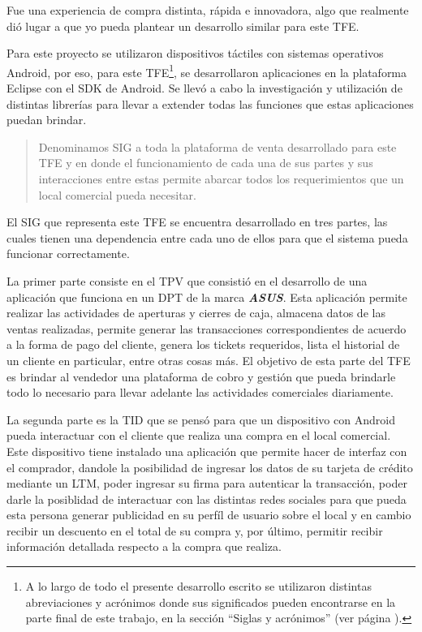 Fue una experiencia de compra distinta, r\'apida e innovadora, algo que realmente di\'o lugar a que yo pueda plantear un desarrollo similar para este \ac{TFE}.

Para este proyecto se utilizaron dispositivos t\'actiles con sistemas operativos Android\Si{\texttrademark}, por eso, para este \ac{TFE}\footnote{A lo largo de todo el presente desarrollo escrito se utilizaron distintas abreviaciones y acr\'onimos donde sus significados pueden encontrarse en la parte final de este trabajo, en la secci\'on ``Siglas y acr\'onimos'' (ver p\'agina \pageref{sec:acronimos}).}, se desarrollaron aplicaciones en la plataforma Eclipse\Si{\texttrademark} con el \ac{SDK} de Android\Si{\texttrademark}. Se llev\'o a cabo la investigaci\'on y utilizaci\'on de distintas librer\'ias para llevar a extender todas las funciones que estas aplicaciones puedan brindar.

\begin{quote}
Denominamos \ac{SIG} a toda la plataforma de venta desarrollado para este \ac{TFE} y en donde el funcionamiento de cada una de sus partes y sus interacciones entre estas permite abarcar todos los requerimientos que un local comercial pueda necesitar.
\end{quote}

El \ac{SIG} que representa este \ac{TFE} se encuentra desarrollado en tres partes, las cuales tienen una dependencia entre cada uno de ellos para que el sistema pueda funcionar correctamente.

La primer parte consiste en el \ac{TPV} que consisti\'o en el desarrollo de una aplicaci\'on que funciona en un \ac{DPT} de la marca \textbf{\textit{ASUS}}. Esta aplicaci\'on permite realizar las actividades de aperturas y cierres de caja, almacena datos de las ventas realizadas, permite generar las transacciones correspondientes de acuerdo a la forma de pago del cliente, genera los tickets requeridos, lista el historial de un cliente en particular, entre otras cosas m\'as. El objetivo de esta parte del \ac{TFE} es brindar al vendedor una plataforma de cobro y gesti\'on que pueda brindarle todo lo necesario para llevar adelante las actividades comerciales diariamente.

La segunda parte es la \ac{TID} que se pens\'o para que un dispositivo con Android\Si{\texttrademark} pueda interactuar con el cliente que realiza una compra en el local comercial. Este dispositivo tiene instalado una aplicaci\'on que permite hacer de interfaz con el comprador, dandole la posibilidad de ingresar los datos de su tarjeta de cr\'edito mediante un \ac{LTM}, poder ingresar su firma para autenticar la transacci\'on, poder darle la posiblidad de interactuar con las distintas redes sociales para que pueda esta persona generar publicidad en su perf\'il de usuario sobre el local y en cambio recibir un descuento en el total de su compra y, por \'ultimo, permitir recibir informaci\'on detallada respecto a la compra que realiza.

